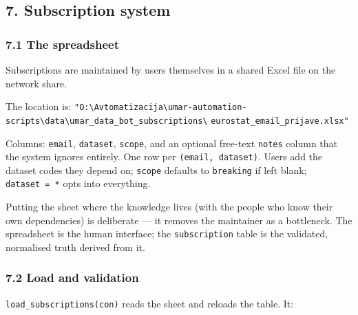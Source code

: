 \documentclass[
]{article}
\begin{document}
\subsection{7. Subscription system}\label{subscription-system}

\subsubsection{7.1 The spreadsheet}\label{the-spreadsheet}

Subscriptions are maintained by users themselves in a shared Excel file
on the network share.

The location is:
\texttt{"O:\textbackslash{}Avtomatizacija\textbackslash{}umar-automation-scripts\textbackslash{}data\textbackslash{}umar\_data\_bot\_subscriptions\textbackslash{}}
\texttt{eurostat\_email\_prijave.xlsx"}

Columns: \texttt{email}, \texttt{dataset}, \texttt{scope}, and an
optional free-text \texttt{notes} column that the system ignores
entirely. One row per \texttt{(email,\ dataset)}. Users add the dataset
codes they depend on; \texttt{scope} defaults to \texttt{breaking} if
left blank; \texttt{dataset\ =\ *} opts into everything.

Putting the sheet where the knowledge lives (with the people who know
their own dependencies) is deliberate --- it removes the maintainer as a
bottleneck. The spreadsheet is the human interface; the
\texttt{subscription} table is the validated, normalised truth derived
from it.

\subsubsection{7.2 Load and validation}\label{load-and-validation}

\texttt{load\_subscriptions(con)} reads the sheet and reloads the table.
It:
\end{document}
